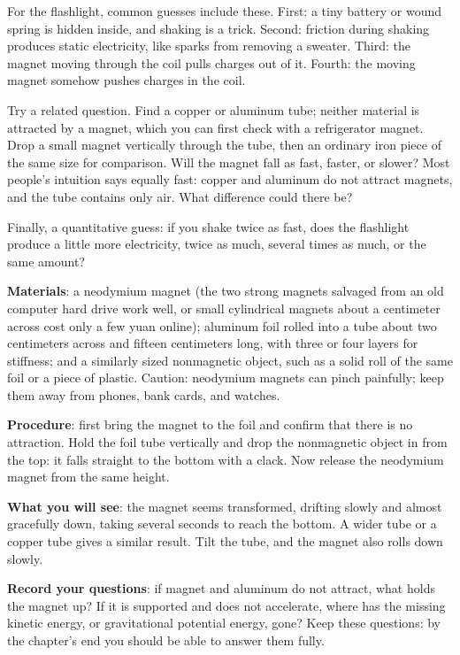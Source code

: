 For the flashlight, common guesses include these. First: a tiny battery or wound spring is hidden inside, and shaking is a trick. Second: friction during shaking produces static electricity, like sparks from removing a sweater. Third: the magnet moving through the coil pulls charges out of it. Fourth: the moving magnet somehow pushes charges in the coil.

Try a related question. Find a copper or aluminum tube; neither material is attracted by a magnet, which you can first check with a refrigerator magnet. Drop a small magnet vertically through the tube, then an ordinary iron piece of the same size for comparison. Will the magnet fall as fast, faster, or slower? Most people's intuition says equally fast: copper and aluminum do not attract magnets, and the tube contains only air. What difference could there be?

Finally, a quantitative guess: if you shake twice as fast, does the flashlight produce a little more electricity, twice as much, several times as much, or the same amount?


\begin{experiment}
\textbf{Materials}: a neodymium magnet (the two strong magnets salvaged from an old computer hard drive work well, or small cylindrical magnets about a centimeter across cost only a few yuan online); aluminum foil rolled into a tube about two centimeters across and fifteen centimeters long, with three or four layers for stiffness; and a similarly sized nonmagnetic object, such as a solid roll of the same foil or a piece of plastic. Caution: neodymium magnets can pinch painfully; keep them away from phones, bank cards, and watches.

\textbf{Procedure}: first bring the magnet to the foil and confirm that there is no attraction. Hold the foil tube vertically and drop the nonmagnetic object in from the top: it falls straight to the bottom with a clack. Now release the neodymium magnet from the same height.

\textbf{What you will see}: the magnet seems transformed, drifting slowly and almost gracefully down, taking several seconds to reach the bottom. A wider tube or a copper tube gives a similar result. Tilt the tube, and the magnet also rolls down slowly.

\textbf{Record your questions}: if magnet and aluminum do not attract, what holds the magnet up? If it is supported and does not accelerate, where has the missing kinetic energy, or gravitational potential energy, gone? Keep these questions: by the chapter's end you should be able to answer them fully.
\end{experiment}

